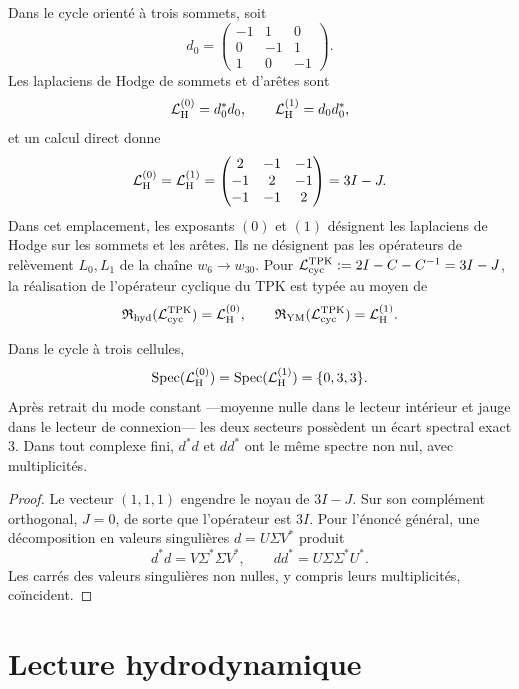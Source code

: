 Dans le cycle orienté à trois sommets, soit
\[
 d_0=
 \begin{pmatrix}
 -1&1&0\\
 0&-1&1\\
 1&0&-1
 \end{pmatrix}.
\]
Les laplaciens de Hodge de sommets et d'arêtes sont
\[
 \mathcal L_{\rm H}^{(0)}=d_0^\ast d_0,
 \qquad
 \mathcal L_{\rm H}^{(1)}=d_0d_0^\ast,
\]
et un calcul direct donne
\[
 \mathcal L_{\rm H}^{(0)}=\mathcal L_{\rm H}^{(1)}=
 \begin{pmatrix}
 2&-1&-1\\
 -1&2&-1\\
 -1&-1&2
 \end{pmatrix}
 =3I-J.
\]
Dans cet emplacement, les exposants \((0)\) et \((1)\) désignent les
laplaciens de Hodge sur les sommets et les arêtes. Ils ne désignent pas les opérateurs de
relèvement \(L_0,L_1\) de la chaîne \(w_6\to w_{30}\). Pour
\(\mathcal L_{\rm cyc}^{\rm TPK}:=2I-C-C^{-1}=3I-J\), la réalisation de
l'opérateur cyclique du TPK est typée au moyen de
\[
 \mathfrak R_{\rm hyd}(\mathcal L_{\rm cyc}^{\rm TPK})
 =\mathcal L_{\rm H}^{(0)},\qquad
 \mathfrak R_{\rm YM}(\mathcal L_{\rm cyc}^{\rm TPK})
 =\mathcal L_{\rm H}^{(1)}.
\]

\begin{theorem}
\label{thm:operador-comun-frontera-ns-ym}
Dans le cycle à trois cellules,
\[
 \operatorname{Spec}(\mathcal L_{\rm H}^{(0)})
 =\operatorname{Spec}(\mathcal L_{\rm H}^{(1)})
 =\{0,3,3\}.
\]
Après retrait du mode constant ---moyenne nulle dans le lecteur intérieur et
jauge dans le lecteur de connexion--- les deux secteurs possèdent un écart spectral exact \(3\).
Dans tout complexe fini, \(d^\ast d\) et \(dd^\ast\) ont le même spectre
non nul, avec multiplicités.
\end{theorem}

\begin{proof}
Le vecteur \((1,1,1)\) engendre le noyau de \(3I-J\). Sur son complément
orthogonal, \(J=0\), de sorte que l'opérateur est \(3I\). Pour l'énoncé
général, une décomposition en valeurs singulières \(d=U\Sigma V^\ast\) produit
\[
 d^\ast d=V\Sigma^\ast\Sigma V^\ast,
 \qquad
 dd^\ast=U\Sigma\Sigma^\ast U^\ast.
\]
Les carrés des valeurs singulières non nulles, y compris leurs
multiplicités, coïncident.
\end{proof}

\section{Lecture hydrodynamique}

